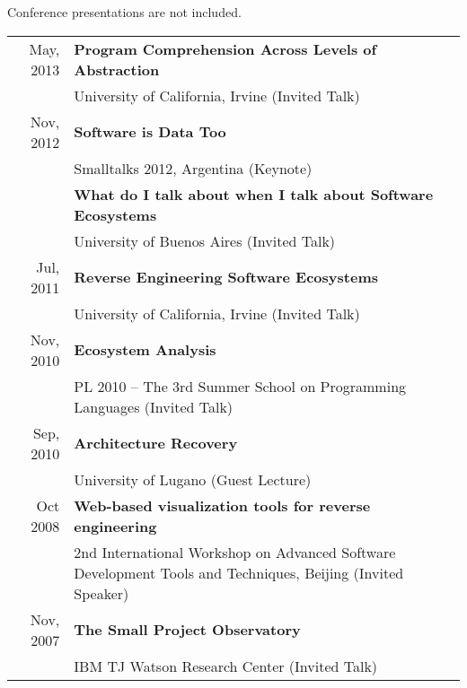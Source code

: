 Conference presentations are not included.
\vspace{1em}

\newcommand {\talk}[4]{{\small #4} & {\bf #1} \\ & #3 (#2) \vspace{0.75em} \\}

\begin{tabular}{rp{11cm}}
	
	\talk 
		{Program Comprehension Across Levels of Abstraction}
		{Invited Talk}
		{University of California, Irvine}
		{May, 2013}

	\talk
		{Software is Data Too}
		{Keynote}
		{Smalltalks 2012, Argentina}
		{Nov, 2012}

	\talk
		{What do I talk about when I talk about Software Ecosystems}
		{Invited Talk}
		{University of Buenos Aires}
		{}	

	\talk 
		{Reverse Engineering Software Ecosystems}
		{Invited Talk}
		{University of California, Irvine}
		{Jul, 2011}

	\talk
		{Ecosystem Analysis}
		{Invited Talk}
		{PL 2010 -- The 3rd Summer School on Programming Languages}
		{Nov, 2010}

	\talk
		{Architecture Recovery}
		{Guest Lecture}
		{University of Lugano}
		{Sep, 2010}

	\talk
		{Web-based visualization tools for reverse engineering}
		{Invited Speaker}
		{2nd International Workshop on Advanced Software Development Tools and Techniques, Beijing}
		{Oct 2008}

	\talk 
		{The Small Project Observatory}
		{Invited Talk}
		{IBM TJ Watson Research Center}
		{Nov, 2007}
\end{tabular}

